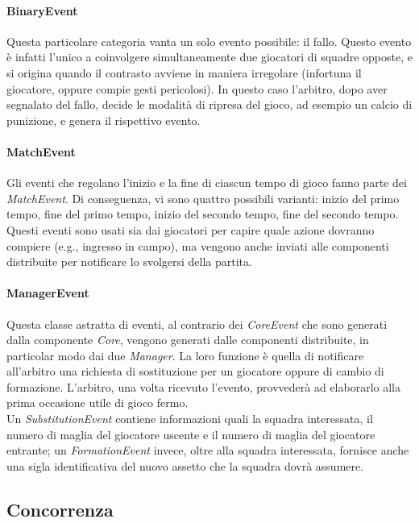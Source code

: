 \paragraph{BinaryEvent} Questa particolare categoria vanta un solo evento possibile: il fallo. Questo evento è infatti l'unico a coinvolgere simultaneamente due giocatori di squadre opposte, e si origina quando il contrasto avviene in maniera irregolare (infortuna il giocatore, oppure compie gesti pericolosi). In questo caso l'arbitro, dopo aver segnalato del fallo, decide le modalità di ripresa del gioco, ad esempio un calcio di punizione, e genera il rispettivo evento.

\paragraph{MatchEvent} Gli eventi che regolano l'inizio e la fine di ciascun tempo di gioco fanno parte dei \textit{MatchEvent}. Di conseguenza, vi sono quattro possibili varianti: inizio del primo tempo, fine del primo tempo, inizio del secondo tempo, fine del secondo tempo. Questi eventi sono usati sia dai giocatori per capire quale azione dovranno compiere (e.g., ingresso in campo), ma vengono anche inviati alle componenti distribuite per notificare lo svolgersi della partita.

\paragraph{ManagerEvent} Questa classe astratta di eventi, al contrario dei \textit{CoreEvent} che sono generati dalla componente \textit{Core}, vengono generati dalle componenti distribuite, in particolar modo dai due \textit{Manager}. La loro funzione è quella di notificare all'arbitro una richiesta di sostituzione per un giocatore oppure di cambio di formazione. L'arbitro, una volta ricevuto l'evento, provvederà ad elaborarlo alla prima occasione utile di gioco fermo.\\

Un \textit{SubstitutionEvent} contiene informazioni quali la squadra interessata, il numero di maglia del giocatore uscente e il numero di maglia del giocatore entrante; un \textit{FormationEvent} invece, oltre alla squadra interessata, fornisce anche una sigla identificativa del nuovo assetto che la squadra dovrà assumere.

\subsection{Concorrenza}
\label{sec:analisi_concorrenza}

